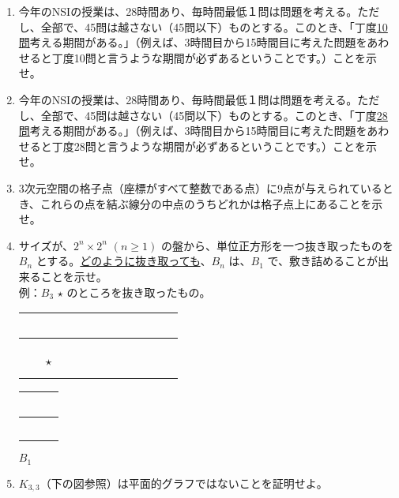 \begin{enumerate}
\begin{enumerate}
	\item 今年のNSIの授業は、28時間あり、毎時間最低１問は問題を考える。ただし、全部で、45問は越さない（45問以下）ものとする。このとき、「丁度\underline{10問}考える期間がある。」（例えば、3時間目から15時間目に考えた問題をあわせると丁度10問と言うような期間が必ずあるということです。）ことを示せ。%
	\item 今年のNSIの授業は、28時間あり、毎時間最低１問は問題を考える。ただし、全部で、45問は越さない（45問以下）ものとする。このとき、「丁度\underline{28問}考える期間がある。」（例えば、3時間目から15時間目に考えた問題をあわせると丁度28問と言うような期間が必ずあるということです。）ことを示せ。%
	\item 3次元空間の格子点（座標がすべて整数である点）に9点が与えられているとき、これらの点を結ぶ線分の中点のうちどれかは格子点上にあることを示せ。%
	\item サイズが、$2^n\times 2^n$ $(n\geq 1)$ の盤から、単位正方形を一つ抜き取ったものを $B_n$ とする。\underline{どのように抜き取っても}、$B_n$ は、$B_1$ で、敷き詰めることが出来ることを示せ。\\%
\vspace{2ex}
例：$B_3$ $\star$ のところを抜き取ったもの。\\
\vspace{2ex}
\begin{tabular}{|c|c|c|c|c|c|c|c|}
\hline \mbox{ } & \mbox{ } & \mbox{ } & \mbox{ } & \mbox{ } & \mbox{ } & 
\mbox{ } & \mbox{ }\\
\hline  &  &  &  &  &  &  & \\
\hline  &  &  &  &  &  &  & \\
\hline  &  &  &  &  &  &  & \\
\hline  &  &  &  &  &  &  & \\
\hline  &$\star$ &  &  &  &  &  & \\
\hline  &  &  &  &  &  &  & \\
\hline  &  &  &  &  &  &  & \\
\hline \end{tabular}
\quad
\begin{tabular}{|c|c}\cline{1-1}
\mbox{ } & \mbox{ }\\ \hline
\mbox{ } & \multicolumn{1}{c|}{\mbox{ } }\\
\hline
\end{tabular}
\quad $B_1$

	\item $K_{3,3}$（下の図参照）は平面的グラフではないことを証明せよ。


\end{enumerate}
\end{enumerate}
